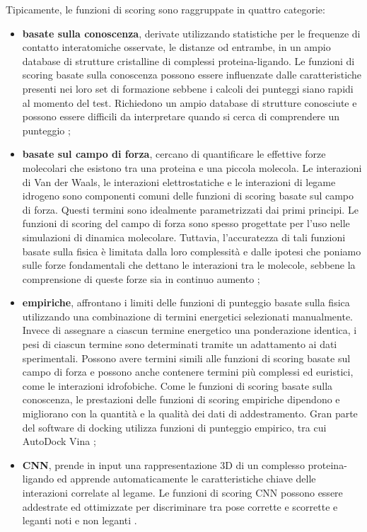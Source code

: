 Tipicamente, le funzioni di scoring sono raggruppate in quattro categorie:
\begin{itemize}
    \item \textbf{basate sulla conoscenza}, derivate utilizzando statistiche per le frequenze di contatto interatomiche osservate, le distanze od entrambe, in un ampio database di strutture cristalline di complessi proteina-ligando. Le funzioni di scoring basate sulla conoscenza possono essere influenzate dalle caratteristiche presenti nei loro set di formazione sebbene i calcoli dei punteggi siano rapidi al momento del test. Richiedono un ampio database di strutture conosciute e possono essere difficili da interpretare quando si cerca di comprendere un punteggio \cite{mcnutt_gnina_2021, koes_lessons_2013}; 
    
    \item \textbf{basate sul campo di forza}, cercano di quantificare le effettive forze molecolari che esistono tra una proteina e una piccola molecola. Le interazioni di Van der Waals, le interazioni elettrostatiche e le interazioni di legame idrogeno sono componenti comuni delle funzioni di scoring basate sul campo di forza. Questi termini sono idealmente parametrizzati dai primi principi. Le funzioni di scoring del campo di forza sono spesso progettate per l'uso nelle simulazioni di dinamica molecolare. Tuttavia, l'accuratezza di tali funzioni basate sulla fisica è limitata dalla loro complessità e dalle ipotesi che poniamo sulle forze fondamentali che dettano le interazioni tra le molecole, sebbene la comprensione di queste forze sia in continuo aumento \cite{mcnutt_gnina_2021, koes_lessons_2013}; 
    
    \item \textbf{empiriche}, affrontano i limiti delle funzioni di punteggio basate sulla fisica utilizzando una combinazione di termini energetici selezionati manualmente. Invece di assegnare a ciascun termine energetico una ponderazione identica, i pesi di ciascun termine sono determinati tramite un adattamento ai dati sperimentali. Possono avere termini simili alle funzioni di scoring basate sul campo di forza e possono anche contenere termini più complessi ed euristici, come le interazioni idrofobiche. Come le funzioni di scoring basate sulla conoscenza, le prestazioni delle funzioni di scoring empiriche dipendono e migliorano con la quantità e la qualità dei dati di addestramento. Gran parte del software di docking utilizza funzioni di punteggio empirico, tra cui AutoDock Vina \cite{mcnutt_gnina_2021, koes_lessons_2013};
    \item \textbf{CNN}, prende in input una rappresentazione 3D di un complesso proteina-ligando ed apprende automaticamente le caratteristiche chiave delle interazioni correlate al legame. Le funzioni di scoring CNN possono essere addestrate ed ottimizzate per discriminare tra pose corrette e scorrette e leganti noti e non leganti \cite{mcnutt_gnina_2021}.
\end{itemize}

